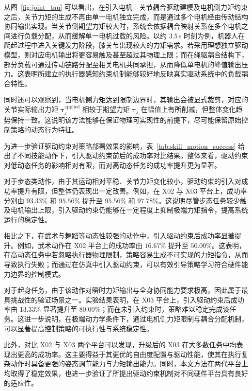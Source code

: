 从图~\ref{fig:joint_tau} 可以看出，在引入电机—关节耦合驱动建模及电机侧力矩约束之后，关节力矩的生成不再由单一电机独立完成，而是通过多个电机经由传动结构协同输出实现。当关节侧期望力矩较大时，系统会依据耦合映射关系在多个电机之间进行负载分配，从而缓解单一电机过载的风险。以约 $3.5\,\mathrm{s}$ 时刻为例，机器人在爬起过程中进入关键发力阶段，膝关节出现较大的力矩需求。若采用理想独立驱动模型，则对应电机输出将更容易触及甚至超过其物理上限；而在绳驱耦合结构下，部分负载可通过传动链路分配至相关电机共同承担，从而降低单电机的峰值输出压力。这表明所建立的执行器感知约束机制能够较好地反映真实驱动系统中的负载耦合特性。

同时还可以观察到，当电机侧力矩达到限制边界时，其输出会被显式裁剪，对应的关节实际输出力矩 $\boldsymbol{\tau}_j^{\mathrm{applied}}$ 相较于期望力矩 $\boldsymbol{\tau}_j$ 在幅值上有所削减，但整体变化趋势保持一致。这说明该方法能够在保证物理可实现性的前提下，尽可能保留原始控制策略的动态行为特征。

为进一步验证驱动约束对策略部署效果的影响，表~\ref{tab:skill_motion_success} 给出了不同技能动作下，引入驱动约束前后的成功率对比结果。整体来看，驱动约束对低动态任务的影响相对有限，而对高动态任务的成功率提升更为显著。


对于步态类动作，由于其运动相对平稳、关节力矩变化较小，驱动约束的引入对成功率提升有限，但整体仍表现出一定改善。例如，在 X02 与 X03 平台上，成功率分别由 $93.33\%$ 和 $95.56\%$ 提升至 $95.56\%$ 和 $97.78\%$。这说明尽管步态任务较少触及电机输出上限，引入驱动约束仍能够在一定程度上抑制极端力矩指令，提高系统运行的稳定性。

相比之下，在武术与舞蹈等动态性较强的动作中，引入驱动约束后成功率显著提升。例如，武术动作在 X02 平台上的成功率由 $16.67\%$ 提升至 $50.00\%$。这表明，在高动态任务中若忽略执行器物理限制，策略容易生成不可实现的力矩指令，从而导致执行失败；而通过在仿真中引入驱动约束，可以有效引导策略学习符合硬件能力边界的控制模式。

对于起身任务，由于该动作对瞬时力矩输出与全身协同能力要求极高，因此属于最具挑战性的验证场景之一。实验结果表明，在 X03 平台上，引入驱动约束后成功率由 $13.33\%$ 显著提升至 $80.00\%$；而在未引入约束时，策略难以稳定完成该任务。这进一步说明，在极端动力学条件下，通过电机侧力矩限制与耦合分配机制，可以显著提高控制策略的可执行性与系统稳定性。

此外，对比 X02 与 X03 两个平台可以发现，升级后的 X03 在大多数任务中均表现出更高的成功率。这主要得益于其更优的自由度配置与驱动性能，使其在执行复杂动作时具备更强的姿态调节能力与力矩输出能力。同时，本文方法在两代平台上均取得了稳定效果，也进一步验证了所提出驱动约束机制对不同硬件平台具有良好的适应性。

